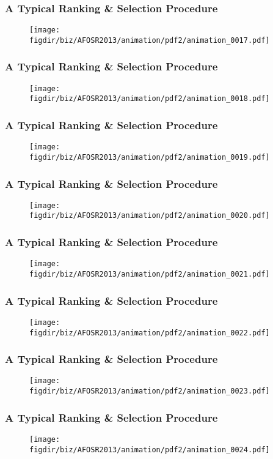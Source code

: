 \documentclass[13pt]{beamer}
\newcommand{\figdir}{../../fig}
\begin{document}
\begin{frame}\frametitle{A Typical Ranking \& Selection Procedure}\begin{figure}\texttt{[image: \\figdir/biz/AFOSR2013/animation/pdf2/animation\_0017.pdf]}\end{figure}\end{frame}
\begin{frame}\frametitle{A Typical Ranking \& Selection Procedure}\begin{figure}\texttt{[image: \\figdir/biz/AFOSR2013/animation/pdf2/animation\_0018.pdf]}\end{figure}\end{frame}
\begin{frame}\frametitle{A Typical Ranking \& Selection Procedure}\begin{figure}\texttt{[image: \\figdir/biz/AFOSR2013/animation/pdf2/animation\_0019.pdf]}\end{figure}\end{frame}
\begin{frame}\frametitle{A Typical Ranking \& Selection Procedure}\begin{figure}\texttt{[image: \\figdir/biz/AFOSR2013/animation/pdf2/animation\_0020.pdf]}\end{figure}\end{frame}
\begin{frame}\frametitle{A Typical Ranking \& Selection Procedure}\begin{figure}\texttt{[image: \\figdir/biz/AFOSR2013/animation/pdf2/animation\_0021.pdf]}\end{figure}\end{frame}
\begin{frame}\frametitle{A Typical Ranking \& Selection Procedure}\begin{figure}\texttt{[image: \\figdir/biz/AFOSR2013/animation/pdf2/animation\_0022.pdf]}\end{figure}\end{frame}
\begin{frame}\frametitle{A Typical Ranking \& Selection Procedure}\begin{figure}\texttt{[image: \\figdir/biz/AFOSR2013/animation/pdf2/animation\_0023.pdf]}\end{figure}\end{frame}
\begin{frame}\frametitle{A Typical Ranking \& Selection Procedure}\begin{figure}\texttt{[image: \\figdir/biz/AFOSR2013/animation/pdf2/animation\_0024.pdf]}\end{figure}\end{frame}
\end{document}
